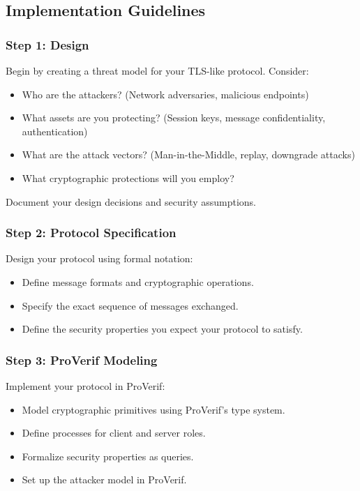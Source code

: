 \documentclass[10pt,a4paper,american]{exam}
\begin{document}
\subsection*{Implementation Guidelines}

\subsubsection*{Step 1: Design}
Begin by creating a threat model for your TLS-like protocol. Consider:
\begin{itemize}
	\item Who are the attackers? (Network adversaries, malicious endpoints)
	\item What assets are you protecting? (Session keys, message confidentiality, authentication)
	\item What are the attack vectors? (Man-in-the-Middle, replay, downgrade attacks)
	\item What cryptographic protections will you employ?
\end{itemize}

Document your design decisions and security assumptions.

\subsubsection*{Step 2: Protocol Specification}
Design your protocol using formal notation:
\begin{itemize}
	\item Define message formats and cryptographic operations.
	\item Specify the exact sequence of messages exchanged.
	\item Define the security properties you expect your protocol to satisfy.
\end{itemize}

\subsubsection*{Step 3: ProVerif Modeling}
Implement your protocol in ProVerif:
\begin{itemize}
	\item Model cryptographic primitives using ProVerif's type system.
	\item Define processes for client and server roles.
	\item Formalize security properties as queries.
	\item Set up the attacker model in ProVerif.
\end{itemize}
\end{document}
